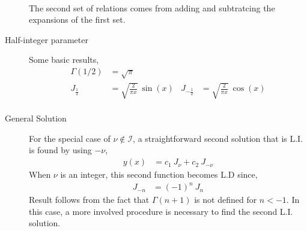\begin{description}
\begin{align}
        \end{align}
        The second set of relations comes from adding and subtratcing the expansions of
        the first set.
    \item[Half-integer parameter] Some basic results,
        \begin{align}
            \Gamma(1/2)      & = \sqrt{\pi}                        \\
            J_{\frac{1}{2}}  & = \sqrt{\frac{2}{\pi x}}\ \sin(x) &
            J_{-\frac{1}{2}} & = \sqrt{\frac{2}{\pi x}}\ \cos(x)   \\
        \end{align}
    \item[General Solution] For the special case of $ \nu \not\in \mathcal{I} $, a
        straightforward second solution that is L.I. is found by using $ -\nu $,
        \begin{align}
            y(x) & = c_1\ J_\nu + c_2\ J_{-\nu}
        \end{align}
        When $ \nu $ is an integer, this second function becomes L.D since,
        \begin{align}
            J_{-n} & = (-1)^n\ J_n
        \end{align}
        Result follows from the fact that $ \Gamma(n+1) $ is not defined for $ n < -1 $.
        In this case, a more involved procedure is necessary to find the second L.I.
        solution.
\end{description}

